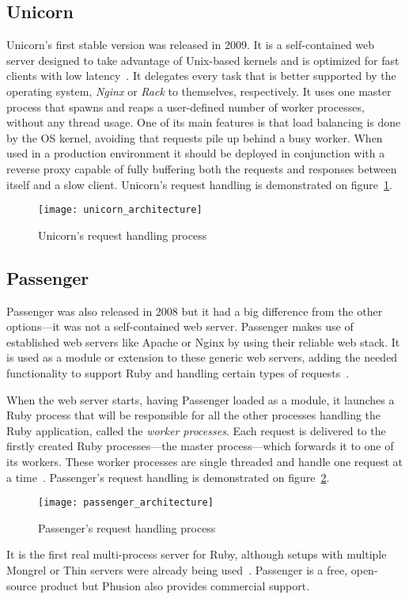 \subsection{Unicorn}
Unicorn's first stable version was released in 2009. It is a self-contained web server designed to take advantage of Unix-based kernels and is optimized for fast clients with low latency~\cite{unicorn}. It delegates every task that is better supported by the operating system, \textit{Nginx} or \textit{Rack} to themselves, respectively. It uses one master process that spawns and reaps a user-defined number of worker processes, without any thread usage. One of its main features is that load balancing is done by the OS kernel, avoiding that requests pile up behind a busy worker. When used in a production environment it should be deployed in conjunction with a reverse proxy capable of fully buffering both the requests and responses between itself and a slow client.
Unicorn's request handling is demonstrated on figure~\ref{fig:unicorn_architecture}.
\begin{figure}[h]
  \centering
    \texttt{[image: unicorn\_architecture]}
  \caption{Unicorn's request handling process}
  \label{fig:unicorn_architecture}
\end{figure}


\subsection{Passenger}
Passenger was also released in 2008 but it had a big difference from the other options---it was not a self-contained web server. Passenger makes use of established web servers like Apache or Nginx by using their reliable web stack. It is used as a module or extension to these generic web servers, adding the needed functionality to support Ruby and handling certain types of requests~\cite{passenger_whatis}.

When the web server starts, having Passenger loaded as a module, it launches a Ruby process that will be responsible for all the other processes handling the Ruby application, called the \textit{worker processes}. Each request is delivered to the firstly created Ruby processes---the master process---which forwards it to one of its workers. These worker processes are single threaded and handle one request at a time~\cite{ruby_webservers}. Passenger's request handling is demonstrated on figure~\ref{fig:passenger_architecture}.
\begin{figure}[h]
  \centering
    \texttt{[image: passenger\_architecture]}
  \caption{Passenger's request handling process}
  \label{fig:passenger_architecture}
\end{figure}
It is the first real multi-process server for Ruby, although setups with multiple Mongrel or Thin servers were already being used~\cite{passenger_whatis}. Passenger is a free, open-source product but Phusion also provides commercial support.


